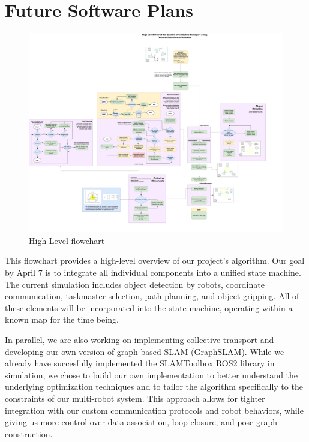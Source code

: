 \chapter{Future Software Plans}
\begin{figure}[H]
    \centering
    \includegraphics[width=1\linewidth, angle=-90]{assets/images/future_software_plans/Flow7AprilCompromise.drawio (1).png}
    \caption{High Level flowchart}
    \label{fig:gantt_chart}
\end{figure}

\newpage
This flowchart provides a high-level overview of our project’s algorithm. Our goal by April 7 is to integrate all individual components into a unified state machine. The current simulation includes object detection by robots, coordinate communication, taskmaster selection, path planning, and object gripping. All of these elements will be incorporated into the state machine, operating within a known map for the time being.


\vspace{\baselineskip}
In parallel, we are also working on implementing collective transport and developing our own version of graph-based SLAM (GraphSLAM). While we already have succesfully implemented the SLAMToolbox ROS2 library in simulation, we chose to build our own implementation to better understand the underlying optimization techniques and to tailor the algorithm specifically to the constraints of our multi-robot system. This approach allows for tighter integration with our custom communication protocols and robot behaviors, while giving us more control over data association, loop closure, and pose graph construction.
